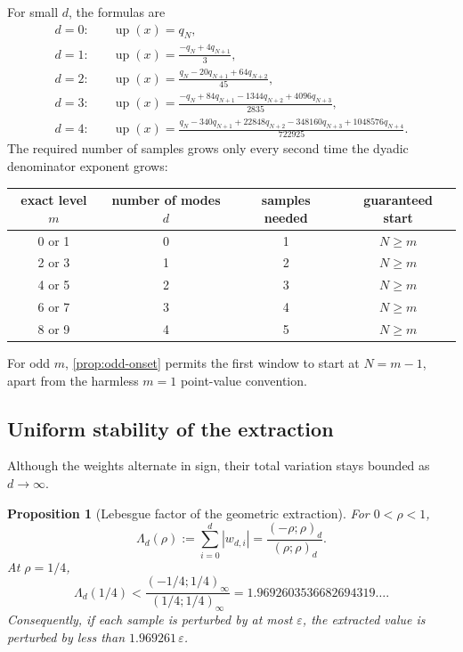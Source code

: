 \documentclass[11pt,oneside]{article}
\newtheorem{proposition}[theorem]{Proposition}
\theoremstyle{definition}
\theoremstyle{remark}
\newcommand{\up}{\operatorname{up}}
\newcommand{\abs}[1]{\left\lvert#1\right\rvert}
\begin{document}
For small \(d\), the formulas are
\begin{align}
 d=0:\quad&\up(x)=q_N,\label{eq:weights-d0}\\
 d=1:\quad&\up(x)=\frac{-q_N+4q_{N+1}}{3},\label{eq:weights-d1}\\
 d=2:\quad&\up(x)=\frac{q_N-20q_{N+1}+64q_{N+2}}{45},\label{eq:weights-d2}\\
 d=3:\quad&\up(x)=
 \frac{-q_N+84q_{N+1}-1344q_{N+2}+4096q_{N+3}}{2835},\label{eq:weights-d3}\\
 d=4:\quad&\up(x)=\frac{q_N-340q_{N+1}+22848q_{N+2}
 -348160q_{N+3}+1048576q_{N+4}}{722925}.
 \label{eq:weights-d4}
\end{align}
The required number of samples grows only every second time the dyadic
denominator exponent grows:
\begin{center}
\begin{tabular}{c c c c}
\toprule
exact level \(m\)&number of modes \(d\)&samples needed&guaranteed start\\
\midrule
0 or 1&0&1&\(N\ge m\)\\
2 or 3&1&2&\(N\ge m\)\\
4 or 5&2&3&\(N\ge m\)\\
6 or 7&3&4&\(N\ge m\)\\
8 or 9&4&5&\(N\ge m\)\\
\bottomrule
\end{tabular}
\end{center}
For odd \(m\), \cref{prop:odd-onset} permits the first window to start at
\(N=m-1\), apart from the harmless \(m=1\) point-value convention.

\subsection{Uniform stability of the extraction}

Although the weights alternate in sign, their total variation stays bounded
as \(d\to\infty\).

\begin{proposition}[Lebesgue factor of the geometric extraction]\label{prop:stability}
For \(0<\rho<1\),
\begin{equation}\label{eq:stability-factor}
 \boxed{\displaystyle
 \Lambda_d(\rho):=\sum_{i=0}^{d}\abs{w_{d,i}}
 =\frac{(-\rho;\rho)_d}{(\rho;\rho)_d}.}
\end{equation}
At \(\rho=1/4\),
\begin{equation}\label{eq:stability-numeric}
 \Lambda_d(1/4)<\frac{(-1/4;1/4)_\infty}{(1/4;1/4)_\infty}
 =1.9692603536682694319\ldots.
\end{equation}
Consequently, if each sample is perturbed by at most \(\varepsilon\), the
extracted value is perturbed by less than \(1.969261\,\varepsilon\).
\end{proposition}
\end{document}

